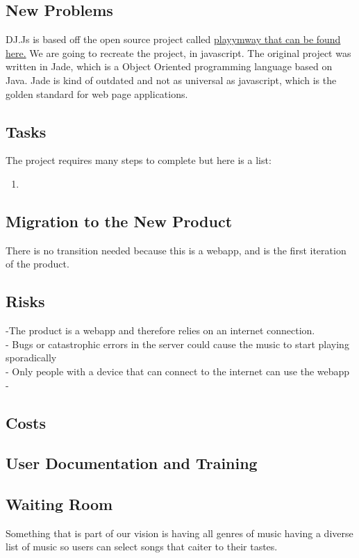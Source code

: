 \documentclass[12pt, titlepage]{article}
\begin{document}
\subsection{New Problems}
DJ.Js is based off the open source project called \href{https://github.com/malithsen/playmyway}{playymway that can be found here.} We are going to recreate the project, in javascript. The original project was written in Jade, which is a Object Oriented programming language based on Java. Jade is kind of outdated and not as universal as javascript, which is the golden standard for web page applications.
\subsection{Tasks}
The project requires many steps to complete but here is a list:
\begin{enumerate}
\item 
\end{enumerate}
\subsection{Migration to the New Product}
There is no transition needed because this is a webapp, and is the first iteration of the product.
\subsection{Risks}
-The product is a webapp and therefore relies on an internet connection. \\
- Bugs or catastrophic errors in the server could cause the music to start
  playing sporadically \\
- Only people with a device that can connect to the internet can use the webapp\\
- 

\subsection{Costs}

\subsection{User Documentation and Training}

\subsection{Waiting Room}
Something that is part of our vision is having all genres of music having a diverse list of music so users can select songs that caiter to their tastes.
\end{document}
